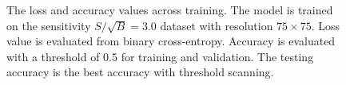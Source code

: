 \documentclass[12pt]{article}
\begin{document}
\begin{figure}[htpb]
{                } 
                \caption{The loss and accuracy values across training. The model is trained on the sensitivity $S / \sqrt{B} = 3.0$ dataset with resolution $75\times 75$. Loss value is evaluated from binary cross-entropy. Accuracy is evaluated with a threshold of 0.5 for training and validation. The testing accuracy is the best accuracy with threshold scanning.}
                \label{fig:loss_acc_across_training_SB_3_res_75}
            \end{figure}

            \begin{figure}[htpb]
                \centering
                 \\ 
\end{figure}
\end{document}
